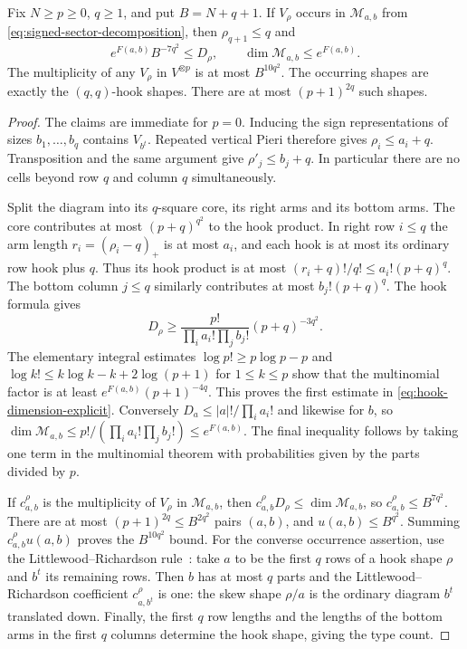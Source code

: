\begin{lemma}
\label{lem:signed-hook-carriers}
Fix $N\ge p\ge0$, $q\ge1$, and put $B=N+q+1$.
If $V_\rho$ occurs in $\mathcal M_{a,b}$ from
\eqref{eq:signed-sector-decomposition}, then $\rho_{q+1}\le q$ and
\begin{equation}
 e^{F(a,b)}B^{-7q^2}\le D_\rho,
 \qquad
 \dim\mathcal M_{a,b}\le e^{F(a,b)}.
 \label{eq:hook-dimension-explicit}
\end{equation}
The multiplicity of any $V_\rho$ in $V^{\otimes p}$ is at most
$B^{10q^2}$. The occurring shapes are exactly the $(q,q)$-hook
shapes. There are at most $(p+1)^{2q}$ such shapes.
\end{lemma}
\begin{proof}
The claims are immediate for $p=0$. Inducing the sign representations
of sizes $b_1,\ldots,b_q$ contains $V_{b^t}$. Repeated vertical
Pieri therefore gives $\rho_i\le a_i+q$. Transposition and the
same argument give $\rho'_j\le b_j+q$. In particular there are no
cells beyond row $q$ and column $q$ simultaneously.

Split the diagram into its $q$-square core, its right arms and its
bottom arms. The core contributes at most $(p+q)^{q^2}$ to the
hook product. In right row $i\le q$ the arm length
$r_i=(\rho_i-q)_+$ is at most $a_i$, and each hook is at most
its ordinary row hook plus $q$. Thus its hook product is at most
$(r_i+q)!/q!\le a_i!(p+q)^q$. The bottom column $j\le q$
similarly contributes at most $b_j!(p+q)^q$. The hook formula gives
\[
 D_\rho\ge
 \frac{p!}{\prod_i a_i!\prod_j b_j!}(p+q)^{-3q^2}.
\]
The elementary integral estimates
$\log p!\ge p\log p-p$ and
$\log k!\le k\log k-k+2\log(p+1)$ for $1\le k\le p$
show that the multinomial factor is at least
$e^{F(a,b)}(p+1)^{-4q}$. This proves the first estimate in
\eqref{eq:hook-dimension-explicit}. Conversely
$D_a\le |a|!/\prod_i a_i!$ and likewise for $b$, so
$\dim\mathcal M_{a,b}\le p!/(\prod_i a_i!\prod_jb_j!)
\le e^{F(a,b)}$. The final inequality follows by taking one term
in the multinomial theorem with probabilities given by the parts
divided by $p$.

If $c_{a,b}^{\rho}$ is the multiplicity of $V_\rho$ in
$\mathcal M_{a,b}$, then
$c_{a,b}^{\rho}D_\rho\le\dim\mathcal M_{a,b}$, so
$c_{a,b}^{\rho}\le B^{7q^2}$. There are at most
$(p+1)^{2q}\le B^{2q^2}$ pairs $(a,b)$, and
$u(a,b)\le B^{q^2}$. Summing
$c_{a,b}^{\rho}u(a,b)$ proves the $B^{10q^2}$ bound.
For the converse occurrence assertion, use the Littlewood--Richardson rule~\cite[\S2.13, equation~(2.13.1), and \S2.14]{SamSnowden2012}: take $a$ to be the first $q$
rows of a hook shape $\rho$ and $b^t$ its remaining rows. Then $b$
has at most $q$ parts and the Littlewood--Richardson coefficient
$c_{a,b^t}^{\rho}$ is one: the skew shape $\rho/a$ is the ordinary
diagram $b^t$ translated down. Finally, the first $q$ row lengths
and the lengths of the bottom arms in the first $q$ columns determine
the hook shape, giving the type count.
\end{proof}

